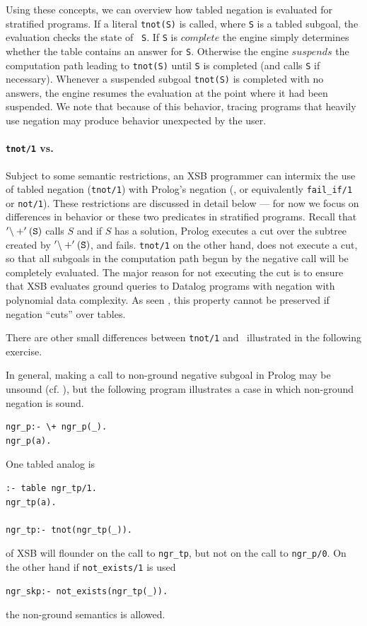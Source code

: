 Using these concepts, we can overview how tabled negation is evaluated
for stratified programs.  If a literal {\tt tnot(S)} is called, where
{\tt S} is a tabled subgoal, the evaluation checks the state of {\tt
S}.  If {\tt S} is $complete$ the engine simply determines whether the
table contains an answer for {\tt S}.  Otherwise the engine $suspends$
the computation path leading to {\tt tnot(S)} until {\tt S} is
completed (and calls {\tt S} if necessary).  Whenever a suspended
subgoal {\tt tnot(S)} is completed with no answers, the engine resumes
the evaluation at the point where it had been suspended.  We note that
because of this behavior, tracing programs that heavily use negation
may produce behavior unexpected by the user.


\paragraph*{{\tt tnot/1} vs. \not }
Subject to some semantic restrictions, an XSB programmer can intermix
the use of tabled negation ({\tt tnot/1}) with Prolog's negation
(\not, or equivalently {\tt fail\_if/1} or {\tt not/1}).  These
restrictions are discussed in detail below --- for now we focus on
differences in behavior or these two predicates in stratified
programs.  Recall that ${\tt '\backslash+'(S)}$ calls $S$ and if $S$
has a solution, Prolog executes a cut over the subtree created by
${\tt '\backslash+'(S)}$, and fails.  {\tt tnot/1} on the other hand,
does not execute a cut, so that all subgoals in the computation path
begun by the negative call will be completely evaluated.  The major
reason for not executing the cut is to ensure that XSB evaluates
ground queries to Datalog programs with negation with polynomial data
complexity.  As seen \cite{ChWa96}, this property cannot be preserved
if negation ``cuts'' over tables.

There are other small differences between {\tt tnot/1} and \not 
\ illustrated in the following exercise.

\begin{exercise}
In general, making a call to non-ground negative subgoal in Prolog may
be unsound (cf. \cite{Lloy84}), but the following program illustrates
a case in which non-ground negation is sound.
\begin{verbatim}
ngr_p:- \+ ngr_p(_).
ngr_p(a).
\end{verbatim}
One tabled analog is 
\begin{verbatim}
:- table ngr_tp/1.
ngr_tp(a).

ngr_tp:- tnot(ngr_tp(_)).
\end{verbatim}
\version{} of XSB will flounder on the call to {\tt ngr\_tp}, but not
on the call to {\tt ngr\_p/0}.  On the other hand if {\tt not\_exists/1}
is used
\begin{verbatim}
ngr_skp:- not_exists(ngr_tp(_)).
\end{verbatim}
the non-ground semantics is allowed.  
\end{exercise}

